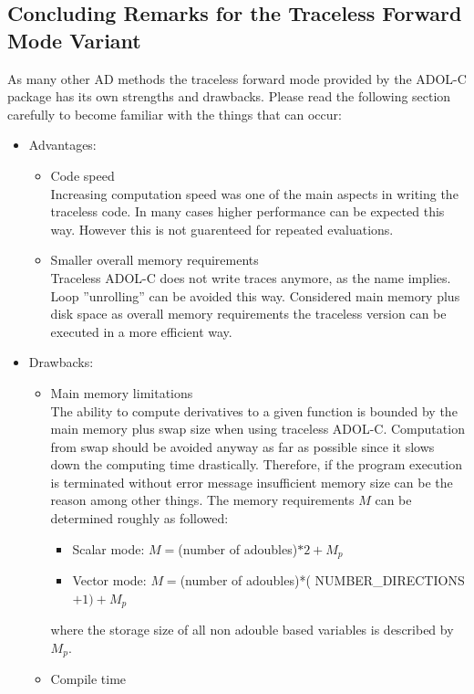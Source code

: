 \documentclass[11pt,twoside]{article}
\begin{document}
\subsection{Concluding Remarks for the Traceless Forward Mode Variant}
%
As many other AD methods the traceless forward mode provided by the
ADOL-C package has its own strengths and drawbacks. Please read the
following section carefully to become familiar with the things that
can occur: 
\begin{itemize}
  \item Advantages:
    \begin{itemize}
      \item Code speed\\
	Increasing computation speed was one of the main aspects in writing
	the traceless code. In many cases higher performance can be
	expected this way. However this is not guarenteed for repeated
        evaluations.
      \item Smaller overall memory requirements\\
	Traceless ADOL-C does not write traces anymore, as the name
	implies. Loop ''unrolling'' can be avoided this
	way. Considered main memory plus disk space as overall memory
	requirements the traceless version can be 
	executed in a more efficient way. 
    \end{itemize}
  \item Drawbacks:
    \begin{itemize}
    \item Main memory limitations\\
      The ability to compute derivatives to a given function is
      bounded by the main memory plus swap size  when using
      traceless ADOL-C. Computation from swap should be avoided anyway
      as far as possible since it slows down the computing time
      drastically. Therefore, if the program execution is  
      terminated without error message insufficient memory size can be
      the reason among other things. The memory requirements $M$ can
      be determined roughly as followed: 
      \begin{itemize}
        \item Scalar mode: $M=$(number of {\sf adouble}s)$*2 + M_p$
	\item Vector mode: $M=$(number of {\sf adouble}s)*({\sf
	  NUMBER\_DIRECTIONS}$+1) + M_p$ 
      \end{itemize}
      where the storage size of all non {\sf adouble} based variables is described by $M_p$.
    \item Compile time\\

\end{itemize}
\end{itemize}
\end{document}

